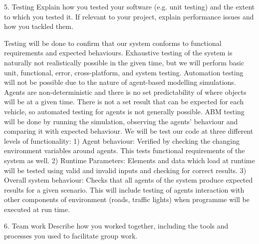 \documentclass[11pt]{article}
\begin{document}
5. Testing Explain how you tested your software (e.g. unit testing) and the extent to which you tested it. If relevant to your project, explain performance issues and how you tackled them.

Testing will be done to confirm that our system conforms to functional requirements and expected behaviours. Exhaustive testing of the system is naturally not realistically possible in the given time, but we will perform basic unit, functional, error, cross-platform, and system testing. 
Automation testing will not be possible due to the nature of agent-based modelling simulations. Agents are non-deterministic and there is no set predictability of where objects will be at a given time. There is not a set result that can be expected for each vehicle, so automated testing for agents is not generally possible. 
ABM testing will be done by running the simulation, observing the agents' behaviour and comparing it with expected behaviour. We will be test our code at three diﬀerent levels of functionality:
1)  Agent behaviour: Verified by checking the changing environment variables around agents. This tests functional requirements of the system as well.
2)  Runtime Parameters: Elements and data which load at runtime will be tested using valid and invalid inputs and checking for correct results. 
3)  Overall system behaviour: Checks that all agents of the system produce expected results for a given scenario.
This will include testing of agents interaction with other components of environment (roads, traﬃc lights) when programme will be executed at run time.

6. Team work Describe how you worked together, including the tools and processes you used to facilitate group work.
\end{document}
